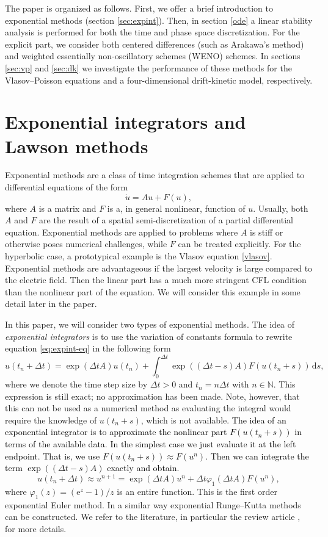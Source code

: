 The paper is organized as follows. First, we offer a brief introduction to exponential methods (section \ref{sec:expint}). Then, in section \ref{ode} a linear stability analysis is performed for both the time and phase space discretization. For the explicit part, we consider both centered differences (such as Arakawa's method) and weighted essentially non-oscillatory schemes (WENO) schemes. In sections \ref{sec:vp} and \ref{sec:dk} we investigate the performance of these methods for the Vlasov--Poisson equations and a four-dimensional drift-kinetic model, respectively. 

\section{Exponential integrators and Lawson methods \label{sec:expint}}

Exponential methods are a class of time integration schemes that are applied to differential equations of the form
\begin{equation} \label{eq:expint-eq} \dot{u} = Au + F(u), \end{equation}
where $A$ is a matrix and $F$ is a, in general nonlinear, function of $u$. Usually, both $A$ and $F$ are the result of a spatial semi-discretization of a partial differential equation. Exponential methods are applied to problems where $A$ is stiff or otherwise poses numerical challenges, while $F$ can be treated explicitly.
For the hyperbolic case, a prototypical example is the Vlasov equation \eqref{vlasov}. 
Exponential methods are advantageous if the largest velocity is large compared to the electric field. 
Then the linear part has a much more stringent CFL condition than the nonlinear part of the equation. 
We will consider this example in some detail later in the paper.

In this paper, we will consider two types of exponential methods. The idea of \textit{exponential integrators} is to use the variation of constants formula to rewrite equation \eqref{eq:expint-eq} in the following form
\[ u(t_n+\Delta t) = \exp(\Delta t A) u(t_n) + \int_0^{\Delta t} \exp((\Delta t -s)A) F(u(t_n+s)) \,\mathrm{d}s, \]
where we denote the time step size by $\Delta t >0$ and $t_n = n\Delta t$ with $n\in\mathbb{N}$. This expression is still exact; \ie no approximation has been made. Note, however, that this can not be used as a numerical method as evaluating the integral would require the knowledge of $u(t_n+s)$, which is not available. \textcolor{black}{The idea of an exponential integrator is to approximate the nonlinear part $F(u(t_n+s))$ in terms of the available data. In the simplest case we just evaluate it at the left endpoint. That is, we use $F(u(t_n+s))\approx F(u^n)$. Then we can integrate the term $\exp((\Delta t -s)A)$ exactly and obtain.}
\[ u(t_n+\Delta t) \approx u^{n+1} = \exp(\Delta t A) u^n + \Delta t \varphi_1(\Delta t A) F(u^n), \]
where $\varphi_1(z)=(\mathrm{e}^z-1)/z$ is an entire function. This is the first order exponential Euler method. In a similar way exponential Runge--Kutta methods can be constructed. We refer to the literature, in particular the review article \cite{Hochbruck:2010}, for more details.

